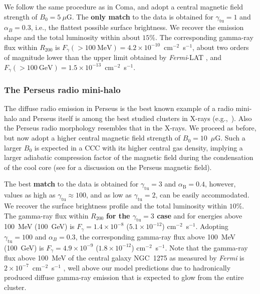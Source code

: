 \documentclass[traditabstract]{aa}
\def\C#1{{\bf #1}}
\newcommand{\rmn}{\mathrm}
\begin{document}
We follow the same procedure as in Coma, and adopt a central magnetic field
strength of $B_{0}=5~\mu$G. The \C{only match} to the data is obtained for 
$\gamma_{\rmn{tu}}=1$ and $\alpha_B=0.3$, i.e., the flattest possible surface 
brightness. We recover the emission shape and the total luminosity within about 
$15\%$. The corresponding gamma-ray flux within $R_{200}$ is 
$F_{\gamma} (>100~\rmn{MeV}) = 4.2 \times10^{-10}$~cm$^{-2}$~s$^{-1}$, 
about two orders of magnitude lower than the upper limit obtained by 
\emph{Fermi}-LAT \citep{2010ApJ...717L..71A}, and 
$F_{\gamma} (>100~\rmn{GeV}) =1.5 \times10^{-13}$~cm$^{-2}$~s$^{-1}$.


\subsubsection{The Perseus radio mini-halo}

The diffuse radio emission in Perseus is the best known example of a radio
mini-halo \citep{1990MNRAS.246..477P} and Perseus itself is among the best
studied clusters in X-rays
(e.g.,~\citealp{2003ApJ...590..225C,2006MNRAS.366..417F,2011arXiv1105.5025F}). Also
the Perseus radio morphology resembles that in the X-rays. We proceed as before,
but now adopt a higher central magnetic field strength of
$B_{0}=10$~$\mu$G. Such a larger $B_0$ is expected in a CCC with its higher
central gas density, implying a larger adiabatic compression factor of the
magnetic field during the condensation of the cool core (see
\citealp{2010ApJ...710..634A,2011arXiv1111.5544M} for a discussion on the
Perseus magnetic field).

The best \C{match} to the data is obtained for $\gamma_{\rmn{tu}}=3$ and
$\alpha_{\rmn{B}}=0.4$, however, values as high as $\gamma_{\rmn{tu}} \approx
100$, and as low as $\gamma_{\rmn{tu}}=2$, can be easily accommodated. We
recover the surface brightness profile and the total luminosity within $10\%$.
%
The gamma-ray flux within $R_{200}$ \C{for the $\gamma_{\rmn{tu}}=3$ case} and for energies above
100~MeV (100~GeV) is $F_{\gamma} = 1.4 \times 10^{-8}$ ($5.1 \times 10^{-12}$)
cm$^{-2}$~s$^{-1}$. Adopting $\gamma_{\rmn{tu}}=100$ and $\alpha_B=0.3$, the
corresponding gamma-ray flux above 100~MeV (100~GeV) is $F_{\gamma} = 4.9 \times
10^{-9}$ ($1.8 \times 10^{-12}$) cm$^{-2}$~s$^{-1}$. Note that the gamma-ray
flux above 100~MeV of the central galaxy NGC~1275 as measured by \emph{Fermi} is
$2 \times 10^{-7}$~cm$^{-2}$~s$^{-1}$ \citep{2009arXiv0904.1904T}, well above
our model predictions due to hadronically produced diffuse gamma-ray emission
that is expected to glow from the entire cluster.
\end{document}
